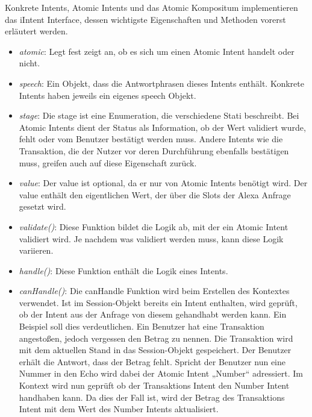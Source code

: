 Konkrete Intents, Atomic Intents und das Atomic Kompositum implementieren das iIntent Interface, dessen wichtigste Eigenschaften und Methoden vorerst erläutert werden.
\begin{itemize}
    \item \textit{atomic}: Legt fest \bzw zeigt an, ob es sich um einen Atomic Intent handelt oder nicht.
    
    \item \textit{speech}: Ein Objekt, dass die Antwortphrasen dieses Intents enthält. Konkrete Intents haben jeweils ein eigenes speech Objekt. 
    
    \item \textit{stage}: Die stage ist eine Enumeration, die verschiedene Stati beschreibt. Bei Atomic Intents dient der Status als Information, ob der Wert validiert wurde, fehlt oder vom Benutzer bestätigt werden muss. Andere Intents wie die Transaktion, die der Nutzer vor deren Durchführung ebenfalls bestätigen muss, greifen auch auf diese Eigenschaft zurück.
    
    \item \textit{value}: Der value ist optional, da er nur von Atomic Intents benötigt wird. Der value enthält den eigentlichen Wert, der über die Slots der Alexa Anfrage gesetzt wird. 
    
    \item \textit{validate()}: Diese Funktion bildet die Logik ab, mit der ein Atomic Intent validiert wird. Je nachdem was validiert werden muss, kann diese Logik variieren.
    
    \item \textit{handle()}: Diese Funktion enthält die Logik eines Intents.
    
    \item \textit{canHandle()}: Die canHandle Funktion wird beim Erstellen des Kontextes verwendet. Ist im Session-Objekt bereits ein Intent enthalten, wird geprüft, ob der Intent aus der Anfrage von diesem gehandhabt werden kann. Ein Beispiel soll dies verdeutlichen. Ein Benutzer hat eine Transaktion angestoßen, jedoch vergessen den Betrag zu nennen. Die Transaktion wird mit dem aktuellen Stand in das Session-Objekt gespeichert. Der Benutzer erhält die Antwort, dass der Betrag fehlt. Spricht der Benutzer nun eine Nummer in den Echo wird dabei der Atomic Intent „Number“ adressiert. Im Kontext wird nun geprüft ob der Transaktions Intent den Number Intent handhaben kann. Da dies der Fall ist, wird der Betrag des Transaktions Intent mit dem Wert des Number Intents aktualisiert.
\end{itemize}

